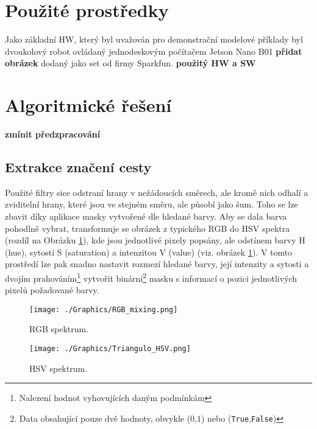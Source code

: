 \documentclass[czech, bc, kky, he, iso690alph]{fasthesis}
\begin{document}
        \section{Použité prostředky}
            Jako základní HW, který byl uvažován pro demonstrační modelové příklady byl dvoukolový robot ovládaný jednodeskovým počítačem Jetson Nano B01 \textbf{přidat obrázek} dodaný jako set od firmy Sparkfun.
            \textbf{použitý HW a SW}
        \section{Algoritmické řešení}
        \textbf{zmínit předzpracování}
            \subsection{Extrakce značení cesty}
            	Použité filtry sice odstraní hrany v nežádoucích směrech, ale kromě nich odhalí a zviditelní hrany, které jsou ve stejném směru, ale působí jako šum. Toho se lze zbavit díky aplikace masky vytvořené dle hledané barvy. Aby se dala barva pohodlně vybrat, transformuje se obrázek z typického RGB do HSV spektra (rozdíl na Obrázku \ref{pic:HSV_spektrum}), kde jsou jednotlivé pixely popsány, ale odstínem barvy H (hue), sytostí S (saturation) a intenzitou V (value) (viz. obrázek \ref{pic:HSV_spektrum}). V tomto prostředí lze pak snadno nastavit rozmezí hledané barvy, její intenzity a sytosti a dvojím prahováním\footnote{Nalezení hodnot vyhovujících daným podmínkám} vytvořit binární\footnote{Data obsahující pouze dvě hodnoty, obvykle (\(0\),\(1\)) nebo (\verb"True",\verb"False")} masku s informací o pozici jednotlivých pixelů požadované barvy.\\
            	\begin{figure}[ht]
            		\centering
            		\texttt{[image: ./Graphics/RGB\_mixing.png]}
            		\caption{RGB spektrum.}
            	\end{figure}
            	
            	\begin{figure}[ht]
            		\centering
            		\texttt{[image: ./Graphics/Triangulo\_HSV.png]}
            		\caption{HSV spektrum.}
            		\label{pic:HSV_spektrum}
            	\end{figure}
            	
\end{document}
